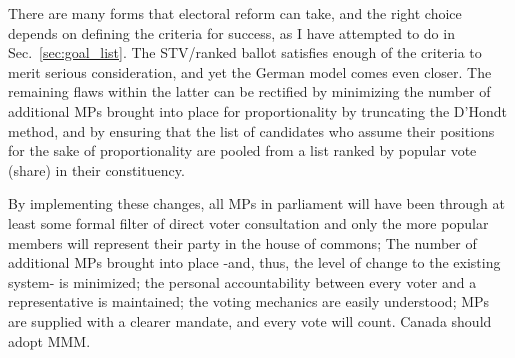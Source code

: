 \documentclass[DIV=calc, paper=a4, fontsize=11pt, twocolumn]{scrartcl}	 %
\begin{document}
There are many forms that electoral reform can take, and the right choice depends on defining the criteria for success, as I have attempted to do in Sec.~\ref{sec:goal_list}. The STV/ranked ballot satisfies enough of the criteria to merit serious consideration, and yet the German model comes even closer. 
The remaining flaws within the latter can be rectified by minimizing the number of additional MPs brought into place for proportionality by truncating the D'Hondt method, and by ensuring that the list of candidates who assume their positions for the sake of proportionality are pooled from a list ranked by popular vote (share) in their constituency. 

By implementing these changes, all MPs in parliament will have been through at least some formal filter of direct voter consultation and only the more popular members will represent their party in the house of commons; The number of additional MPs brought into place \--and, thus, the level of change to the existing system\-- is minimized; the  personal accountability between every voter and a representative is maintained; the voting mechanics are easily understood; MPs are supplied with a clearer mandate, and every vote will count.
Canada should adopt MMM. 

\end{document}
